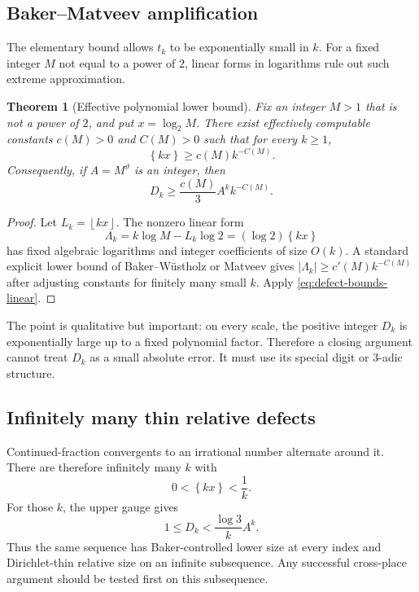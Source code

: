 \documentclass[11pt]{article}
\newtheorem{theorem}{Theorem}[section]
\theoremstyle{definition}
\theoremstyle{remark}
\newcommand{\floor}[1]{\left\lfloor #1\right\rfloor}
\newcommand{\fracpart}[1]{\left\{#1\right\}}
\newcommand{\thetaAE}{\vartheta}
\begin{document}
\subsection{Baker--Matveev amplification}

The elementary bound allows $t_k$ to be exponentially small in $k$.  For a
fixed integer $M$ not equal to a power of $2$, linear forms in logarithms rule
out such extreme approximation.

\begin{theorem}[Effective polynomial lower bound]\label{thm:baker-defect}
Fix an integer $M>1$ that is not a power of $2$, and put $x=\log_2M$.
There exist effectively computable constants $c(M)>0$ and $C(M)>0$ such that
for every $k\ge1$,
\[
  \fracpart{kx}\ge c(M)k^{-C(M)}.
\]
Consequently, if $A=M^{\thetaAE}$ is an integer, then
\begin{equation}\label{eq:baker-D}
  D_k\ge\frac{c(M)}{3}A^kk^{-C(M)}.
\end{equation}
\end{theorem}

\begin{proof}
Let $L_k=\floor{kx}$.  The nonzero linear form
\[
 \Lambda_k=k\log M-L_k\log2=(\log2)\fracpart{kx}
\]
has fixed algebraic logarithms and integer coefficients of size $O(k)$.
A standard explicit lower bound of Baker--W\"ustholz or Matveev gives
$|\Lambda_k|\ge c'(M)k^{-C(M)}$ after adjusting constants for finitely many
small $k$.  Apply \eqref{eq:defect-bounds-linear}.
\end{proof}

The point is qualitative but important: on every scale, the positive integer
$D_k$ is exponentially large up to a fixed polynomial factor.  Therefore a
closing argument cannot treat $D_k$ as a small absolute error.  It must use
its special digit or $3$-adic structure.

\subsection{Infinitely many thin relative defects}

Continued-fraction convergents to an irrational number alternate around it.
There are therefore infinitely many $k$ with
\[
  0<\fracpart{kx}<\frac1k.
\]
For those $k$, the upper gauge gives
\begin{equation}\label{eq:thin-subsequence}
  1\le D_k<\frac{\log3}{k}A^k.
\end{equation}
Thus the same sequence has Baker-controlled lower size at every index and
Dirichlet-thin relative size on an infinite subsequence.  Any successful
cross-place argument should be tested first on this subsequence.
\end{document}
